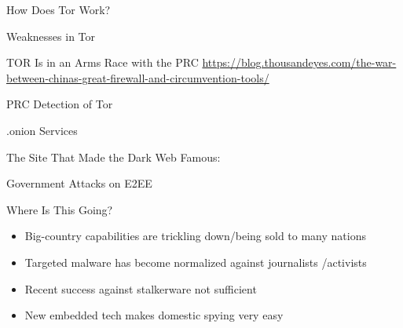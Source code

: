 \documentclass[nobackground,dvipsnames,table]{beamer}
\begin{document}
\begin{frame}{How Does Tor Work?}
\end{frame}

\begin{frame}{Weaknesses in Tor}
\end{frame}

\begin{frame}{TOR Is in an Arms Race with the PRC}
    \url{https://blog.thousandeyes.com/the-war-between-chinas-great-firewall-and-circumvention-tools/}
\end{frame}

\begin{frame}{PRC Detection of Tor}
\end{frame}

\begin{frame}{.onion Services}
\end{frame}

\begin{frame}{The Site That Made the Dark Web Famous:}
\end{frame}

\begin{frame}{Government Attacks on E2EE}
\end{frame}

\begin{frame}{Where Is This Going?}
    \begin{itemize}
        \item Big-country capabilities are trickling down/being sold to many nations
        \item Targeted malware has become normalized  against journalists /activists
        \item Recent success against stalkerware not sufficient 
        \item New embedded tech makes domestic spying very easy
    \end{itemize}
\end{frame}

\backpage
\end{document}

